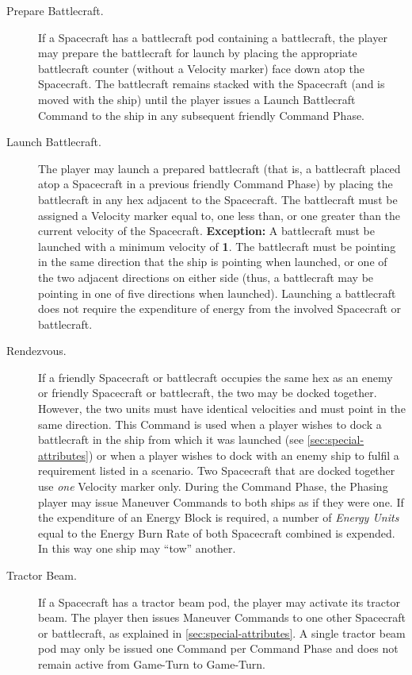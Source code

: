 \begin{description}
\item[Prepare Battlecraft.] If a Spacecraft has a battlecraft pod
containing a battlecraft, the player may prepare the battlecraft for
launch by placing the appropriate battlecraft counter (without a
Velocity marker) face down atop the Spacecraft. The battlecraft
remains stacked with the Spacecraft (and is moved with the ship) until
the player issues a Launch Battlecraft Command to the ship in any
subsequent friendly Command Phase.

\item[Launch Battlecraft.] The player may launch a prepared
battlecraft (that is, a battlecraft placed atop a Spacecraft in a
previous friendly Command Phase) by placing the battlecraft in any hex
adjacent to the Spacecraft. The battlecraft must be assigned a
Velocity marker equal to, one less than, or one greater than the
current velocity of the Spacecraft. \textbf{Exception:} A battlecraft
must be launched with a minimum velocity of \textbf{1}. The
battlecraft must be pointing in the same direction that the ship is
pointing when launched, or one of the two adjacent directions on
either side (thus, a battlecraft may be pointing in one of five
directions when launched). Launching a battlecraft does not require
the expenditure of energy from the involved Spacecraft or battlecraft.

\item[Rendezvous.] If a friendly Spacecraft or battlecraft occupies
the same hex as an enemy or friendly Spacecraft or battlecraft, the
two may be docked together. However, the two units must have identical
velocities and must point in the same direction. This Command is used
when a player wishes to dock a battlecraft in the ship from which it
was launched (see \ref{sec:special-attributes}) or when a player
wishes to dock with an enemy ship to fulfil a requirement listed in a
scenario. Two Spacecraft that are docked together use \emph{one}
Velocity marker only. During the Command Phase, the Phasing player may
issue Maneuver Commands to both ships as if they were one. If the
expenditure of an Energy Block is required, a number of \emph{Energy
  Units} equal to the Energy Burn Rate of both Spacecraft combined is
expended. In this way one ship may ``tow'' another.

\item[Tractor Beam.] If a Spacecraft has a tractor beam pod, the
player may activate its tractor beam. The player then issues Maneuver
Commands to one other Spacecraft or battlecraft, as explained in
\ref{sec:special-attributes}. A single tractor beam pod may only be
issued one Command per Command Phase and does not remain active from
Game-Turn to Game-Turn.


\end{description}

